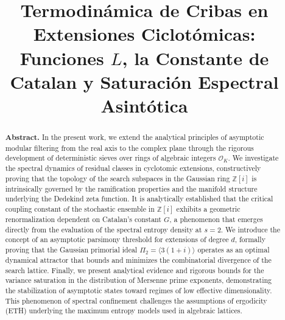 \documentclass{article}
\title{Termodinámica de Cribas en Extensiones Ciclotómicas: Funciones $L$, la Constante de Catalan y Saturación Espectral Asintótica}
\numberwithin{equation}{section}
\theoremstyle{plain}
\theoremstyle{definition}
\begin{document}
\begin{abstract}
\textbf{Abstract.} In the present work, we extend the analytical principles of asymptotic modular filtering from the real axis to the complex plane through the rigorous development of deterministic sieves over rings of algebraic integers $\mathcal{O}_K$. We investigate the spectral dynamics of residual classes in cyclotomic extensions, constructively proving that the topology of the search subspaces in the Gaussian ring $\mathbb{Z}[i]$ is intrinsically governed by the ramification properties and the manifold structure underlying the Dedekind zeta function. It is analytically established that the critical coupling constant of the stochastic ensemble in $\mathbb{Z}[i]$ exhibits a geometric renormalization dependent on Catalan's constant $G$, a phenomenon that emerges directly from the evaluation of the spectral entropy density at $s=2$. We introduce the concept of an asymptotic parsimony threshold for extensions of degree $d$, formally proving that the Gaussian primorial ideal $\Pi_2 = \langle 3(1+i) \rangle$ operates as an optimal dynamical attractor that bounds and minimizes the combinatorial divergence of the search lattice. Finally, we present analytical evidence and rigorous bounds for the variance saturation in the distribution of Mersenne prime exponents, demonstrating the stabilization of asymptotic states toward regimes of low effective dimensionality. This phenomenon of spectral confinement challenges the assumptions of ergodicity (ETH) underlying the maximum entropy models used in algebraic lattices.

\vspace{1em}


\end{abstract}
\end{document}

